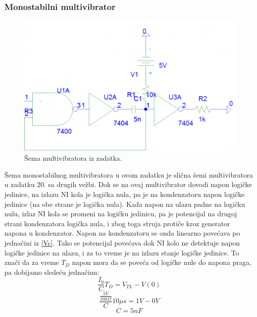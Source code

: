 \documentclass{article}
\begin{document}
                \subsubsection{Monostabilni multivibrator}
                    \begin{figure}[H]
                        \centering
                        \includegraphics[width=\textwidth,height=\textheight,keepaspectratio]{DZ1-2b.png}
                        \caption{Šema multivibratora iz zadatka.}
                        \label{PSpice2b}
                    \end{figure}
                    Šema monostabilnog multivibratora u ovom zadatku je slična šemi multivibratora u zadatku 20. sa drugih vežbi. Dok se na ovaj multivibrator dovodi napon logičke jedinice, na izlazu NI kola je logička nula, pa je na kondenzatoru napon logičke jedinice (na obe strane je logička nula). Kada napon na ulazu padne na logičku nulu, izlaz NI kola se promeni na logičku jedinicu, pa je potencijal na drugoj strani kondenzatora logička nula, i zbog toga struja protiče kroz generator napona u kondenzator. Napon na kondenzatoru se onda linearno povećava po jednačini iz \eqref{Vc}. Tako se potencijal povećava dok NI kolo ne detektuje napon logičke jedinice na ulazu, i za to vreme je na izlazu stanje logičke jedinice. To znači da za vreme $T_D$ napon mora da se poveća od logičke nule do napona praga, pa dobijamo sledeću jednačinu:
                    $$\frac{I_0}{C} T_D = V_{TL} - V(0)$$
                    $$\frac{\frac{5V}{10k\Omega}}{C} 10\mu s = 1V - 0V$$
                    $$C = 5nF$$
\end{document}
